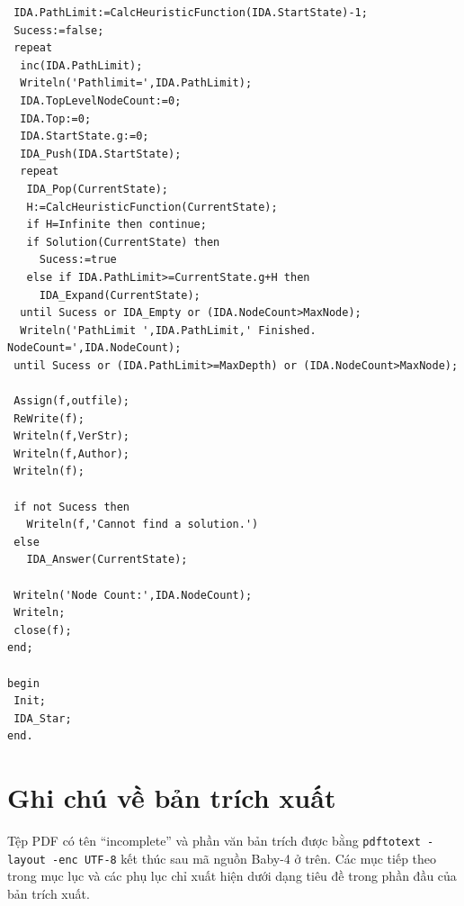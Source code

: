 \documentclass[11pt]{article}
\begin{document}
\begin{verbatim}
 IDA.PathLimit:=CalcHeuristicFunction(IDA.StartState)-1;
 Sucess:=false;
 repeat
  inc(IDA.PathLimit);
  Writeln('Pathlimit=',IDA.PathLimit);
  IDA.TopLevelNodeCount:=0;
  IDA.Top:=0;
  IDA.StartState.g:=0;
  IDA_Push(IDA.StartState);
  repeat
   IDA_Pop(CurrentState);
   H:=CalcHeuristicFunction(CurrentState);
   if H=Infinite then continue;
   if Solution(CurrentState) then
     Sucess:=true
   else if IDA.PathLimit>=CurrentState.g+H then
     IDA_Expand(CurrentState);
  until Sucess or IDA_Empty or (IDA.NodeCount>MaxNode);
  Writeln('PathLimit ',IDA.PathLimit,' Finished. NodeCount=',IDA.NodeCount);
 until Sucess or (IDA.PathLimit>=MaxDepth) or (IDA.NodeCount>MaxNode);

 Assign(f,outfile);
 ReWrite(f);
 Writeln(f,VerStr);
 Writeln(f,Author);
 Writeln(f);

 if not Sucess then
   Writeln(f,'Cannot find a solution.')
 else
   IDA_Answer(CurrentState);

 Writeln('Node Count:',IDA.NodeCount);
 Writeln;
 close(f);
end;

begin
 Init;
 IDA_Star;
end.
\end{verbatim}

\section*{Ghi chú về bản trích xuất}

Tệp PDF có tên ``incomplete'' và phần văn bản trích được bằng
\texttt{pdftotext -layout -enc UTF-8} kết thúc sau mã nguồn Baby-4 ở trên.
Các mục tiếp theo trong mục lục và các phụ lục chỉ xuất hiện dưới dạng tiêu
đề trong phần đầu của bản trích xuất.
\end{document}
